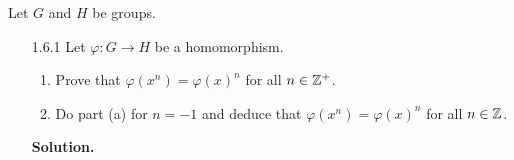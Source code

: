 Let $G$ and $H$ be groups.
\begin{enumerate}
   \item[1.6.1]   Let $\varphi : G \rightarrow H$ be a homomorphism.
                  \begin{enumerate}
                     \item Prove that $\varphi(x^n) = \varphi(x)^n$ for all
                           $n \in \mathbb{Z}^+$.
                     \item Do part (a) for $n = -1$ and deduce that
                           $\varphi(x^n) = \varphi(x)^n$ for all $n \in \mathbb{Z}$.
                  \end{enumerate}

      \textbf{Solution.}


\end{enumerate}
